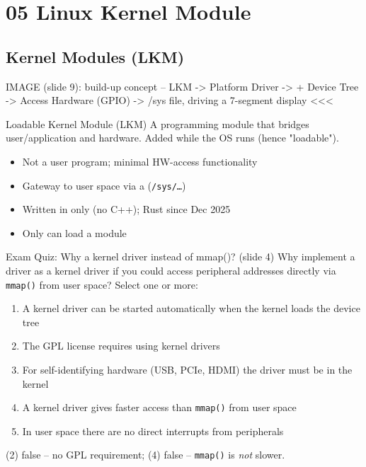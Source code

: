 \section{05 Linux Kernel Module}

\subsection{Kernel Modules (LKM)}

IMAGE (slide 9): build-up concept -- LKM -> Platform Driver -> + Device Tree -> Access Hardware (GPIO) -> /sys file, driving a 7-segment display <<<

\begin{concept}{Loadable Kernel Module (LKM)}
    A programming module that bridges user/application and hardware. Added
     while the OS runs (hence "loadable").
    \begin{itemize}
        \item Not a user program; minimal HW-access functionality
        \item Gateway to user space via a  (\texttt{/sys/\dots})
        \item Written in  only (no C++); Rust since Dec 2025
        \item Only  can load a module
    \end{itemize}
\end{concept}

\begin{example2}{Exam Quiz: Why a kernel driver instead of mmap()? (slide 4)}
    Why implement a driver as a kernel driver if you could access peripheral
    addresses directly via \texttt{mmap()} from user space? Select one or more:
    \begin{enumerate}
        \item A kernel driver can be started automatically when the kernel loads
              the device tree
        \item The GPL license requires using kernel drivers
        \item For self-identifying hardware (USB, PCIe, HDMI) the driver must be in
              the kernel
        \item A kernel driver gives faster access than \texttt{mmap()} from user space
        \item In user space there are no direct interrupts from peripherals
    \end{enumerate}
    \tcblower
    (2) false -- no GPL requirement; (4) false -- \texttt{mmap()} is \emph{not} slower.
\end{example2}

